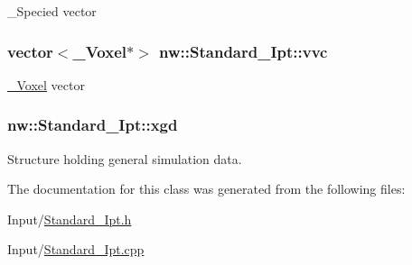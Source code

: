 \+\_\+\+Specied vector 

\hypertarget{classnw_1_1_standard___ipt_a7f93dd90e12eb3a5b023e64feca48572}{
\subsubsection[{vvc}]{\setlength{\rightskip}{0pt plus 5cm}vector$<${\bf \+\_\+\+Voxel}$\ast$$>$ nw\+::\+Standard\+\_\+\+Ipt\+::vvc\hspace{0.3cm}{\ttfamily [private]}}}\label{classnw_1_1_standard___ipt_a7f93dd90e12eb3a5b023e64feca48572}


\hyperlink{classnw_1_1___voxel}{\+\_\+\+Voxel} vector 

\hypertarget{classnw_1_1_standard___ipt_aad5708d9729b7a5f660dade1927b4d4e}{
\subsubsection[{xgd}]{ nw\+::\+Standard\+\_\+\+Ipt\+::xgd\hspace{0.3cm}{\ttfamily [private]}}}\label{classnw_1_1_standard___ipt_aad5708d9729b7a5f660dade1927b4d4e}


Structure holding general simulation data. 



The documentation for this class was generated from the following files\+:\begin{DoxyCompactItemize}
\item 
Input/\hyperlink{_standard___ipt_8h}{Standard\+\_\+\+Ipt.\+h}\item 
Input/\hyperlink{_standard___ipt_8cpp}{Standard\+\_\+\+Ipt.\+cpp}\end{DoxyCompactItemize}
